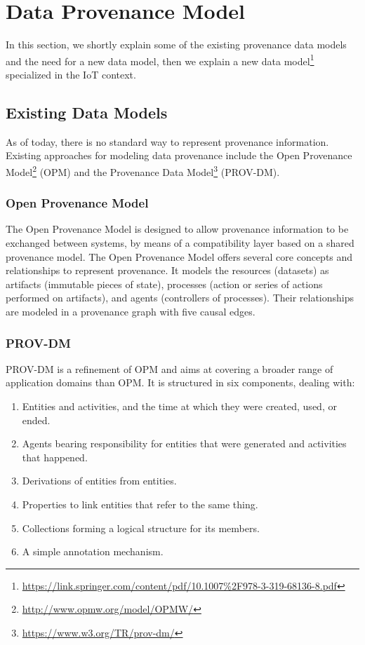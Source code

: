 \section{Data Provenance Model}
In this section, we shortly explain some of the existing provenance data models and the need for a new data model, then we explain a new data model\footnote{\url{https://link.springer.com/content/pdf/10.1007\%2F978-3-319-68136-8.pdf}} specialized in the IoT context.

\subsection{Existing Data Models}
As of today, there is no standard way to represent provenance information. Existing approaches for modeling data provenance include the Open Provenance Model\footnote{\url{http://www.opmw.org/model/OPMW/}} (OPM) and the Provenance Data Model\footnote{\url{https://www.w3.org/TR/prov-dm/}} (PROV-DM).

\subsubsection {Open Provenance Model}
The Open Provenance Model is designed to allow provenance information to be exchanged between systems, by means of a compatibility layer based on a shared provenance model. The Open Provenance Model offers several core concepts and relationships to represent provenance. It models the resources (datasets) as artifacts (immutable pieces of state), processes (action or series of actions performed on artifacts), and agents (controllers of processes). Their relationships are modeled in a provenance graph with five causal edges.

\subsubsection {PROV-DM}
PROV-DM is a refinement of OPM and aims at covering a broader range of application domains than OPM. It is structured in six components, dealing with: 

\begin{enumerate}
	\item Entities and activities, and the time at which they were created, used, or ended.
	\item Agents bearing responsibility for entities that were generated and activities that happened.
	\item Derivations of entities from entities.
	\item Properties to link entities that refer to the same thing.
	\item Collections forming a logical structure for its members.
	\item A simple annotation mechanism.
\end{enumerate}

